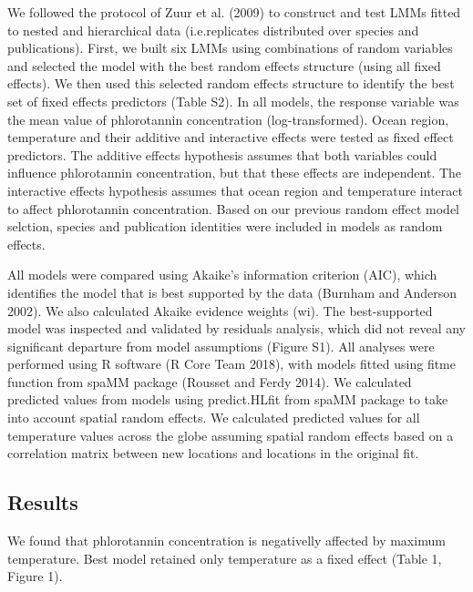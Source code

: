 \documentclass[]{article}
\begin{document}
We followed the protocol of Zuur et al. (2009) to construct and test
LMMs fitted to nested and hierarchical data (i.e.replicates distributed
over species and publications). First, we built six LMMs using
combinations of random variables and selected the model with the best
random effects structure (using all fixed effects). We then used this
selected random effects structure to identify the best set of fixed
effects predictors (Table S2). In all models, the response variable was
the mean value of phlorotannin concentration (log-transformed). Ocean
region, temperature and their additive and interactive effects were
tested as fixed effect predictors. The additive effects hypothesis
assumes that both variables could influence phlorotannin concentration,
but that these effects are independent. The interactive effects
hypothesis assumes that ocean region and temperature interact to affect
phlorotannin concentration. Based on our previous random effect model
selction, species and publication identities were included in models as
random effects.

All models were compared using Akaike's information criterion (AIC),
which identifies the model that is best supported by the data (Burnham
and Anderson 2002). We also calculated Akaike evidence weights (wi). The
best-supported model was inspected and validated by residuals analysis,
which did not reveal any significant departure from model assumptions
(Figure S1). All analyses were performed using R software (R Core Team
2018), with models fitted using fitme function from spaMM package
(Rousset and Ferdy 2014). We calculated predicted values from models
using predict.HLfit from spaMM package to take into account spatial
random effects. We calculated predicted values for all temperature
values across the globe assuming spatial random effects based on a
correlation matrix between new locations and locations in the original
fit.

\subsection{Results}\label{results}

We found that phlorotannin concentration is negativelly affected by
maximum temperature. Best model retained only temperature as a fixed
effect (Table 1, Figure 1).
\end{document}
